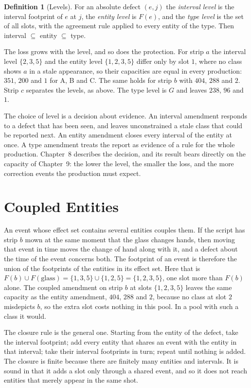\documentclass[11pt,twoside,openright]{book}
\theoremstyle{plain}
\theoremstyle{definition}
\newtheorem{definition}[theorem]{Definition}
\theoremstyle{remark}
\begin{document}
\begin{definition}[Levels]\label{def:levels}
For an absolute defect $(e,j)$ the \emph{interval level} is the interval footprint of $e$ at $j$, the \emph{entity level} is $F(e)$, and the \emph{type level} is the set of all slots, with the agreement rule applied to every entity of the type. Then interval $\subseteq$ entity $\subseteq$ type.
\end{definition}

The loss grows with the level, and so does the protection. For strip $a$ the interval level $\{2,3,5\}$ and the entity level $\{1,2,3,5\}$ differ only by slot $1$, where no class shows $a$ in a stale appearance, so their capacities are equal in every production: $351$, $200$ and $1$ for A, B and C. The same holds for strip $b$ with $404$, $288$ and $2$. Strip $c$ separates the levels, as above. The type level is $G$ and leaves $238$, $96$ and $1$.

The choice of level is a decision about evidence. An interval amendment responds to a defect that has been seen, and leaves unconstrained a stale class that could be reported next. An entity amendment closes every interval of the entity at once. A type amendment treats the report as evidence of a rule for the whole production. Chapter~8 describes the decision, and its result bears directly on the capacity of Chapter~9: the lower the level, the smaller the loss, and the more correction events the production must expect.

\section{Coupled Entities}\label{sec:coupled}

An event whose effect set contains several entities couples them. If the script has strip $b$ mown at the same moment that the glass changes hands, then moving that event in time moves the change of hand along with it, and a defect about the time of the event concerns both. The footprint of an event is therefore the union of the footprints of the entities in its effect set. Here that is $F(b)\cup F(\text{glass})=\{1,3,5\}\cup\{1,2,5\}=\{1,2,3,5\}$, one slot more than $F(b)$ alone. The coupled amendment on strip $b$ at slots $\{1,2,3,5\}$ leaves the same capacity as the entity amendment, $404$, $288$ and $2$, because no class at slot $2$ misdepicts $b$, so the extra slot costs nothing in this pool. In a pool with such a class it would.

The closure rule is the general one. Starting from the entity of the defect, take the interval footprint; add every entity that shares an event with the entity in that interval; take their interval footprints in turn; repeat until nothing is added. The closure is finite because there are finitely many entities and intervals. It is sound in that it adds a slot only through a shared event, and so it does not reach entities that merely appear in the same shot.
\end{document}
